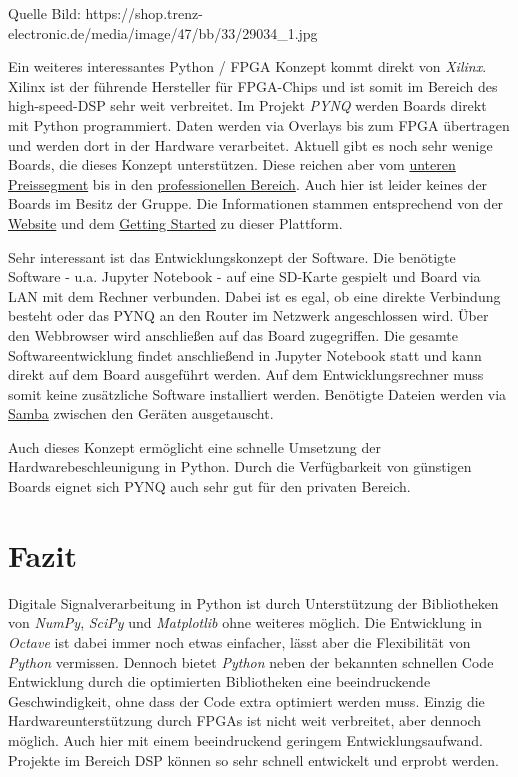 \documentclass[11pt]{article}
\begin{document}
Quelle Bild:
https://shop.trenz-electronic.de/media/image/47/bb/33/29034\_1.jpg

Ein weiteres interessantes Python / FPGA Konzept kommt direkt von
\emph{Xilinx}. Xilinx ist der führende Hersteller für FPGA-Chips und ist
somit im Bereich des high-speed-DSP sehr weit verbreitet. Im Projekt
\emph{PYNQ} werden Boards direkt mit Python programmiert. Daten werden
via Overlays bis zum FPGA übertragen und werden dort in der Hardware
verarbeitet. Aktuell gibt es noch sehr wenige Boards, die dieses Konzept
unterstützen. Diese reichen aber vom
\href{https://store.digilentinc.com/pynq-z1-python-productivity-for-zynq-7000-arm-fpga-soc/}{unteren
Preissegment} bis in den
\href{https://www.xilinx.com/products/boards-and-kits/zcu111.html\#overview}{professionellen
Bereich}. Auch hier ist leider keines der Boards im Besitz der Gruppe.
Die Informationen stammen entsprechend von der
\href{http://www.pynq.io/}{Website} und dem
\href{https://pynq.readthedocs.io/en/latest/index.html}{Getting Started}
zu dieser Plattform.

Sehr interessant ist das Entwicklungskonzept der Software. Die benötigte
Software - u.a. Jupyter Notebook - auf eine SD-Karte gespielt und Board
via LAN mit dem Rechner verbunden. Dabei ist es egal, ob eine direkte
Verbindung besteht oder das PYNQ an den Router im Netzwerk angeschlossen
wird. Über den Webbrowser wird anschließen auf das Board zugegriffen.
Die gesamte Softwareentwicklung findet anschließend in Jupyter Notebook
statt und kann direkt auf dem Board ausgeführt werden. Auf dem
Entwicklungsrechner muss somit keine zusätzliche Software installiert
werden. Benötigte Dateien werden via
\href{https://www.samba.org/}{Samba} zwischen den Geräten ausgetauscht.

Auch dieses Konzept ermöglicht eine schnelle Umsetzung der
Hardwarebeschleunigung in Python. Durch die Verfügbarkeit von günstigen
Boards eignet sich PYNQ auch sehr gut für den privaten Bereich.

    \hypertarget{fazit}{%
\section{Fazit}\label{fazit}}

Digitale Signalverarbeitung in Python ist durch Unterstützung der
Bibliotheken von \emph{NumPy}, \emph{SciPy} und \emph{Matplotlib} ohne
weiteres möglich. Die Entwicklung in \emph{Octave} ist dabei immer noch
etwas einfacher, lässt aber die Flexibilität von \emph{Python}
vermissen. Dennoch bietet \emph{Python} neben der bekannten schnellen
Code Entwicklung durch die optimierten Bibliotheken eine beeindruckende
Geschwindigkeit, ohne dass der Code extra optimiert werden muss. Einzig
die Hardwareunterstützung durch FPGAs ist nicht weit verbreitet, aber
dennoch möglich. Auch hier mit einem beeindruckend geringem
Entwicklungsaufwand. Projekte im Bereich DSP können so sehr schnell
entwickelt und erprobt werden.
\end{document}
